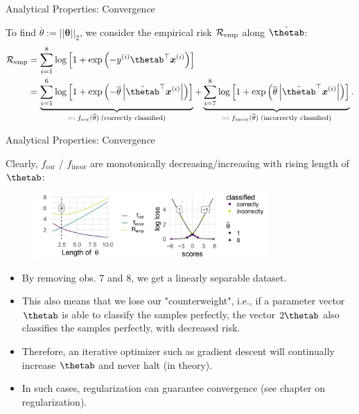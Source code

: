 \begin{vbframe}{Analytical Properties: Convergence}
\medskip

To find $\overline{\theta} := ||\bm{\theta}||_2$, we consider the empirical risk $\mathcal{R}_{\text{emp}}$ along $\tilde\thetab$:
\begin{align*}
\riske &= \sum^8_{i=1} \log \left[1 + \exp \left(-y^{(i)}\thetab^\top \xv^{(i)}\right)\right] \\
&= \underbrace{\sum^6_{i=1} \log \left[1 + \exp \left(- \overline{\theta} \left|\tilde{\thetab}^\top \xv^{(i)}\right|\right)\right]}_{=: \; f_{\text{cor}}(\overline{\theta}) \;\text{(correctly classified)}} +
\underbrace{\sum^8_{i=7}\log \left[1 + \exp \left( \overline{\theta} \left| \tilde{\thetab}^\top \xv^{(i)}\right|\right)\right]}_{=:\; f_{\text{incor}}(\overline{\theta}) \;\text{(incorrectly classified)}}.
\end{align*}

\end{vbframe}


\begin{vbframe}{Analytical Properties: Convergence}



Clearly, $f_{\text{cor}}$ / $f_{\text{incor}}$ are monotonically decreasing/increasing with rising length of $\thetab$:

\begin{figure}
\includegraphics[width=0.8\textwidth]{figure_man/undet-problem02.png}\\
\end{figure}

\begin{itemize}
\item By removing obs. 7 and 8, we get a linearly separable dataset. \\
\item This also means that we lose our "counterweight", i.e., if a parameter vector $\thetab$ is able to classify the samples perfectly, the vector $2\thetab$ also classifies the samples perfectly, with decreased risk.
\item Therefore, an iterative optimizer such as gradient descent will continually increase $\thetab$ and never halt (in theory).
\item In such cases, regularization can guarantee convergence (see chapter on regularization). 
\end{itemize}

\end{vbframe}

\endlecture

